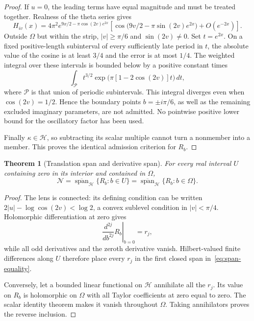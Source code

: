\documentclass[11pt,a4paper]{article}
\numberwithin{equation}{section}
\newtheorem{theorem}{Theorem}[section]
\theoremstyle{definition}
\theoremstyle{remark}
\newcommand{\Hh}{\mathcal H}
\newcommand{\Nn}{\mathcal N}
\newcommand{\cl}{\overline{\operatorname{span}}}
\begin{document}
\begin{proof}
If $u=0$, the leading terms have equal magnitude and must be treated together. Realness of the theta series gives
\begin{equation}\label{eq:oscillatory-tail}
 H_{iv}(x)=4\pi^2e^{9x/2-\pi\cos(2v)e^{2x}}
 \left[\cos\bigl(9v/2-\pi\sin(2v)e^{2x}\bigr)+O(e^{-2x})\right].
\end{equation}
Outside $\Omega$ but within the strip, $|v|\ge\pi/6$ and $\sin(2v)\ne0$. Set $t=e^{2x}$. On a fixed positive-length subinterval of every sufficiently late period in $t$, the absolute value of the cosine is at least $3/4$ and the error is at most $1/4$. The weighted integral over these intervals is bounded below by a positive constant times
\begin{equation}\label{eq:oscillatory-divergence}
 \int_{\mathcal P} t^{3/2}\exp\bigl(\pi[1-2\cos(2v)]t\bigr)\,dt,
\end{equation}
where $\mathcal P$ is that union of periodic subintervals. This integral diverges even when $\cos(2v)=1/2$. Hence the boundary points $b=\pm i\pi/6$, as well as the remaining excluded imaginary parameters, are not admitted. No pointwise positive lower bound for the oscillatory factor has been used.

Finally $\kappa\in\Hh$, so subtracting its scalar multiple cannot turn a nonmember into a member. This proves the identical admission criterion for $R_b$.
\end{proof}

\begin{theorem}[Translation span and derivative span]\label{thm:span}
For every real interval $U$ containing zero in its interior and contained in $\Omega$,
\begin{equation}\label{eq:span-equality}
 \Nn=\cl_{\Hh}\{R_b:b\in U\}
     =\cl_{\Hh}\{R_b:b\in\Omega\}.
\end{equation}
\end{theorem}
\begin{proof}
The lens is connected: its defining condition can be written
$2|u|-\log\cos(2v)<\log2$, a convex sublevel condition in $|v|<\pi/4$.
Holomorphic differentiation at zero gives
\[
 \left.\frac{d^{2j}}{db^{2j}}R_b\right|_{b=0}=r_j,
\]
while all odd derivatives and the zeroth derivative vanish. Hilbert-valued finite differences along $U$ therefore place every $r_j$ in the first closed span in~\eqref{eq:span-equality}.

Conversely, let a bounded linear functional on $\Hh$ annihilate all the $r_j$. Its value on $R_b$ is holomorphic on $\Omega$ with all Taylor coefficients at zero equal to zero. The scalar identity theorem makes it vanish throughout $\Omega$. Taking annihilators proves the reverse inclusion.
\end{proof}
\end{document}
